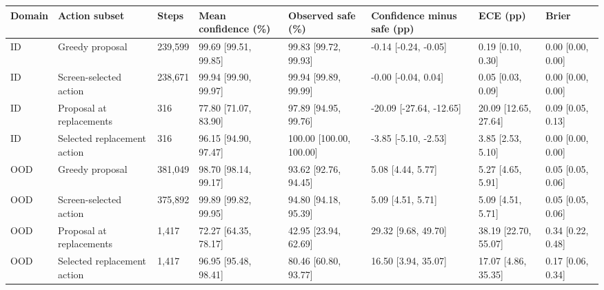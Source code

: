 \begin{tabular}{llllllll}
\toprule
Domain & Action subset & Steps & Mean confidence (\%) & Observed safe (\%) & Confidence minus safe (pp) & ECE (pp) & Brier \\
\midrule
ID & Greedy proposal & 239,599 & 99.69 [99.51, 99.85] & 99.83 [99.72, 99.93] & -0.14 [-0.24, -0.05] & 0.19 [0.10, 0.30] & 0.00 [0.00, 0.00] \\
ID & Screen-selected action & 238,671 & 99.94 [99.90, 99.97] & 99.94 [99.89, 99.99] & -0.00 [-0.04, 0.04] & 0.05 [0.03, 0.09] & 0.00 [0.00, 0.00] \\
ID & Proposal at replacements & 316 & 77.80 [71.07, 83.90] & 97.89 [94.95, 99.76] & -20.09 [-27.64, -12.65] & 20.09 [12.65, 27.64] & 0.09 [0.05, 0.13] \\
ID & Selected replacement action & 316 & 96.15 [94.90, 97.47] & 100.00 [100.00, 100.00] & -3.85 [-5.10, -2.53] & 3.85 [2.53, 5.10] & 0.00 [0.00, 0.00] \\
OOD & Greedy proposal & 381,049 & 98.70 [98.14, 99.17] & 93.62 [92.76, 94.45] & 5.08 [4.44, 5.77] & 5.27 [4.65, 5.91] & 0.05 [0.05, 0.06] \\
OOD & Screen-selected action & 375,892 & 99.89 [99.82, 99.95] & 94.80 [94.18, 95.39] & 5.09 [4.51, 5.71] & 5.09 [4.51, 5.71] & 0.05 [0.05, 0.06] \\
OOD & Proposal at replacements & 1,417 & 72.27 [64.35, 78.17] & 42.95 [23.94, 62.69] & 29.32 [9.68, 49.70] & 38.19 [22.70, 55.07] & 0.34 [0.22, 0.48] \\
OOD & Selected replacement action & 1,417 & 96.95 [95.48, 98.41] & 80.46 [60.80, 93.77] & 16.50 [3.94, 35.07] & 17.07 [4.86, 35.35] & 0.17 [0.06, 0.34] \\
\bottomrule
\end{tabular}
